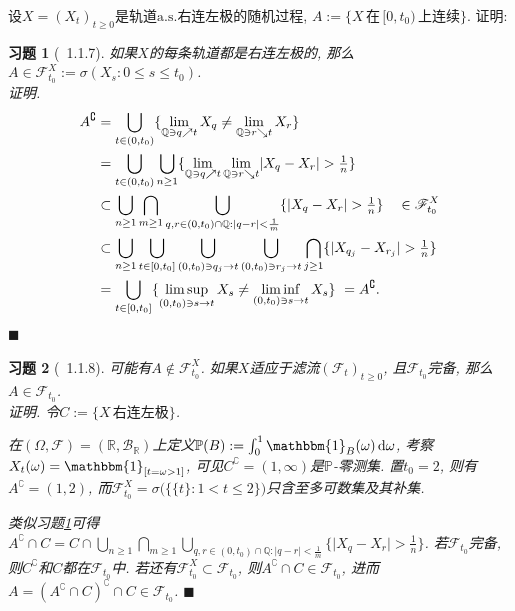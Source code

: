 \documentclass{ctexart}
\theoremstyle{definition}
\theoremstyle{remark}
\theoremstyle{plain}
\newtheorem{Ex}{习题}[section]
\newenvironment{Prf}{\vspace{1ex}\textbf{\\}{\color{red}\textit{证明}}.\normalfont}{\color{red}\hfill$\blacksquare$\vspace{1ex}\par}
\newcommand{\1}{\mathbbm{1}}				%
\newcommand{\as}{\mathrm{a.s.}}				%
\renewcommand{\P}{\mathbb{P}}				%
\newcommand{\abs}[1]{\lvert#1\rvert}			%
\newcommand{\R}{\mathbb{R}}					%
\newcommand{\Q}{\mathbb{Q}}					%
\renewcommand*{\d}{\mathop{}\!\mathrm{d}}	%
\begin{document}
设$X = (X_{t})_{t \ge 0}$是轨道$\as$右连左极的随机过程, $A := \{ X \,\text{在}\, [0,t_{0}) \,\text{上}\text{连续} \}$. 证明:
\begin{Ex}[\cite{Karatzas-Shreve--GTM113}~1.1.7]\label{Ex:measurability}
如果$X$的每条轨道都是右连左极的, 那么$A \in \mathscr{F}_{t_0}^{X} := \sigma(X_{s} : 0 \le s \le t_{0})$.
\begin{Prf}\vspace{-2.3ex}
\[\begin{aligned}
A^{\complement} &= \bigcup_{t \in (0,t_{0})} \{ \lim_{\Q \owns q \nearrow t} X_{q} \neq \lim_{\Q \owns r \searrow t} X_{r} \} \\
&= \bigcup_{t \in (0,t_{0})} \bigcup_{n\ge 1} \{ \lim_{\Q \owns q \nearrow t} \lim_{\Q \owns r \searrow t} \abs{X_{q}-X_{r}} > \tfrac{1}{n} \} \\
&\subset \bigcup_{n\ge 1} \bigcap_{m\ge 1} \bigcup_{q,r \in (0,t_{0})\cap\Q : \abs{q-r}<\frac{1}{m}} \{ \abs{X_{q}-X_{r}} > \tfrac{1}{n} \} \quad \in \mathscr{F}_{t_0}^{X} \\
&\subset \bigcup_{n\ge 1} \bigcup_{t \in [0,t_{0}]} \bigcup_{(0,t_{0}) \owns q_{j} \to t} \bigcup_{(0,t_{0}) \owns r_{j} \to t} \bigcap_{j\ge 1} \{ \abs{X_{q_{j}}-X_{r_{j}}} > \tfrac{1}{n} \} \\
&= \bigcup_{t \in [0,t_{0}]} \{ \limsup_{(0,t_{0}) \owns s \to t} X_{s} \neq \liminf_{(0,t_{0}) \owns s \to t} X_{s} \} \ = A^{\complement} .
\end{aligned}\vspace{-3.7ex}\]
\end{Prf}
\end{Ex}
\begin{Ex}[\cite{Karatzas-Shreve--GTM113}~1.1.8]
可能有$A \notin \mathscr{F}_{t_0}^{X}$. 如果$X$适应于滤流$(\mathscr{F}_{t})_{t \ge 0}$, 且$\mathscr{F}_{t_0}$完备, 那么$A \in \mathscr{F}_{t_0}$.
\begin{Prf}
令$C := \{ X \,\text{右连左极} \}$. \par
在$(\Omega,\mathscr{F}) = (\R,\mathscr{B}_{\R})$上定义$\P(B) := \int_{0}^{1} \1_{B}(\omega) \d\omega$, 考察$X_{t}(\omega) = \1_{[t=\omega>1]}$, 可见$C^{\complement} = (1,\infty)$是$\P$-零测集. 置$t_{0} = 2$, 则有$A^{\complement} = (1,2)$, 而$\mathscr{F}_{t_0}^{X} = \sigma\big(\big\{ \{t\} : 1 < t \le 2 \big\}\big)$只含至多可数集及其补集. \par
类似习题\ref{Ex:measurability}可得$A^{\complement} \cap C = C \cap \bigcup_{n\ge 1} \bigcap_{m\ge 1} \bigcup_{q,r \in (0,t_{0})\cap\Q : \abs{q-r}<\frac{1}{m}} \{ \abs{X_{q}-X_{r}} > \tfrac{1}{n} \}$. 若$\mathscr{F}_{t_0}$完备, 则$C^{\complement}$和$C$都在$\mathscr{F}_{t_0}$中. 若还有$\mathscr{F}_{t_0}^{X} \subset \mathscr{F}_{t_0}$, 则$A^{\complement} \cap C \in \mathscr{F}_{t_0}$, 进而$A = (A^{\complement} \cap C)^{\complement} \cap C \in \mathscr{F}_{t_0}$.
\end{Prf}
\end{Ex}
\end{document}
